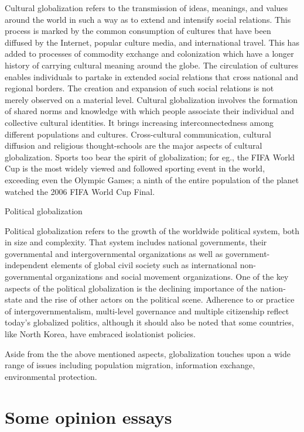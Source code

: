 \documentclass[
  openany]{book}
\begin{document}
Cultural globalization refers to the transmission of ideas, meanings, and values around the world in such a way as to extend and intensify social relations. This process is marked by the common consumption of cultures that have been diffused by the Internet, popular culture media, and international travel. This has added to processes of commodity exchange and colonization which have a longer history of carrying cultural meaning around the globe. The circulation of cultures enables individuals to partake in extended social relations that cross national and regional borders. The creation and expansion of such social relations is not merely observed on a material level. Cultural globalization involves the formation of shared norms and knowledge with which people associate their individual and collective cultural identities. It brings increasing interconnectedness among different populations and cultures. Cross-cultural communication, cultural diffusion and religious thought-schools are the major aspects of cultural globalization. Sports too bear the spirit of globalization; for eg., the FIFA World Cup is the most widely viewed and followed sporting event in the world, exceeding even the Olympic Games; a ninth of the entire population of the planet watched the 2006 FIFA World Cup Final.

Political globalization

Political globalization refers to the growth of the worldwide political system, both in size and complexity. That system includes national governments, their governmental and intergovernmental organizations as well as government-independent elements of global civil society such as international non-governmental organizations and social movement organizations. One of the key aspects of the political globalization is the declining importance of the nation-state and the rise of other actors on the political scene. Adherence to or practice of intergovernmentalism, multi-level governance and multiple citizenship reflect today's globalized politics, although it should also be noted that some countries, like North Korea, have embraced isolationist policies.

Aside from the the above mentioned aspects, globalization touches upon a wide range of issues including population migration, information exchange, environmental protection.

\hypertarget{some-opinion-essays}{%
\section{Some opinion essays}\label{some-opinion-essays}}
\end{document}
